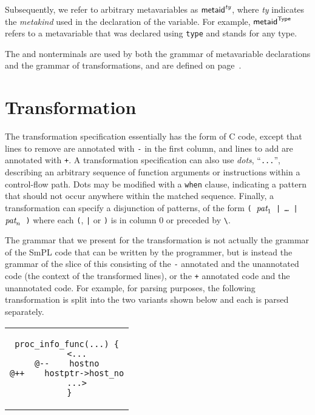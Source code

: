 \documentclass{article}
\newcommand{\mita}[1]{\mbox{\it{{#1}}}}
\newcommand{\mtt}[1]{\mbox{\tt{{#1}}}}
\newcommand{\msf}[1]{\mbox{\sf{{#1}}}}
\newcommand{\ssf}[1]{\mbox{\scriptsize\sf{{#1}}}}
\newcommand{\mth}[1]{\({#1}\)}
\begin{document}
Subsequently, we refer to arbitrary metavariables as
\mth{\msf{metaid}^{\mbox{\scriptsize{\it{ty}}}}}, where {\it{ty}}
indicates the {\it metakind} used in the declaration of the variable.
For example, \mth{\msf{metaid}^{\ssf{Type}}} refers to a metavariable
that was declared using \texttt{type} and stands for any type.

The  and  nonterminals are used by both the grammar of
metavariable declarations and the grammar of transformations, and are
defined on page~\pageref{types}.

\section{Transformation}

The transformation specification essentially has the form of C code,
except that lines to remove are annotated with \verb+-+ in the first
column, and lines to add are annotated with \verb-+-.  A
transformation specification can also use {\em dots}, ``\verb-...-'',
describing an arbitrary sequence of function arguments or instructions
within a control-flow path.  Dots may be modified with a {\tt when}
clause, indicating a pattern that should not occur anywhere within the
matched sequence.  Finally, a transformation can specify a disjunction
of patterns, of the form \mtt{( \mth{\mita{pat}_1} | \mita{\ldots} |
  \mth{\mita{pat}_n} )} where each \texttt{(}, \texttt{|} or
\texttt{)} is in column 0 or preceded by \texttt{\textbackslash}.

The grammar that we present for the transformation is not actually the
grammar of the SmPL code that can be written by the programmer, but is
instead the grammar of the slice of this consisting of the {\tt -}
annotated and the unannotated code (the context of the transformed lines),
or the {\tt +} annotated code and the unannotated code.  For example, for
parsing purposes, the following transformation
is split into the two variants shown below and each is parsed
separately.

\begin{center}
\begin{tabular}{c}
\begin{lstlisting}[language=Cocci]
  proc_info_func(...) {
    <...
@--    hostno
@++    hostptr->host_no
    ...>
 }
\end{lstlisting}\\
\end{tabular}
\end{center}
\end{document}
